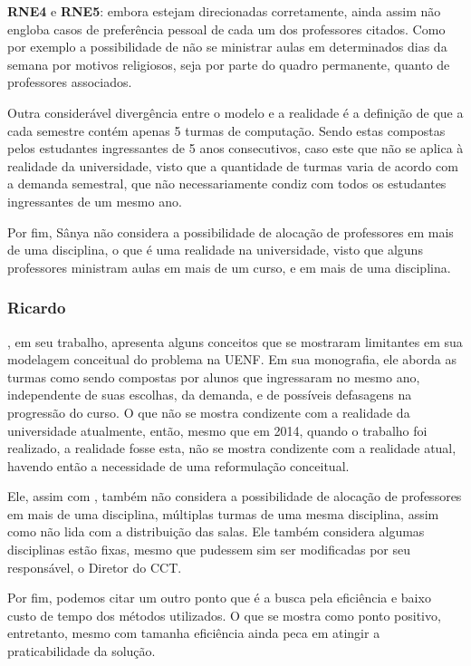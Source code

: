 \textbf{RNE4} e \textbf{RNE5}: embora estejam direcionadas corretamente, ainda assim não engloba casos de preferência pessoal de cada um dos professores citados. Como por exemplo a possibilidade de não se ministrar aulas em determinados dias da semana por motivos religiosos, seja por parte do quadro permanente, quanto de professores associados.

Outra considerável divergência entre o modelo e a realidade é a definição de que a cada semestre contém apenas 5 turmas de computação. Sendo estas compostas pelos estudantes ingressantes de 5 anos consecutivos, caso este que não se aplica à realidade da universidade, visto que a quantidade de turmas varia de acordo com a demanda semestral, que não necessariamente condiz com todos os estudantes ingressantes de um mesmo ano.

Por fim, Sânya não considera a possibilidade de alocação de professores em mais de uma disciplina, o que é uma realidade na universidade, visto que alguns professores ministram aulas em mais de um curso, e em mais de uma disciplina.

\subsubsection*{Ricardo} \label{subsubsec:ricardo} %

, em seu trabalho, apresenta alguns conceitos que se mostraram limitantes em sua modelagem conceitual do problema na UENF. Em sua monografia, ele aborda as turmas como sendo compostas por alunos que ingressaram no mesmo ano, independente de suas escolhas, da demanda, e de possíveis defasagens na progressão do curso. O que não se mostra condizente com a realidade da universidade atualmente, então, mesmo que em 2014, quando o trabalho foi realizado, a realidade fosse esta, não se mostra condizente com a realidade atual, havendo então a necessidade de uma reformulação conceitual.

Ele, assim com , também não considera a possibilidade de alocação de professores em mais de uma disciplina, múltiplas turmas de uma mesma disciplina, assim como não lida com a distribuição das salas. Ele também considera algumas disciplinas estão fixas, mesmo que pudessem sim ser modificadas por seu responsável, o Diretor do CCT.

Por fim, podemos citar um outro ponto que é a busca pela eficiência e baixo custo de tempo dos métodos utilizados. O que se mostra como ponto positivo, entretanto, mesmo com tamanha eficiência ainda peca em atingir a praticabilidade da solução.

